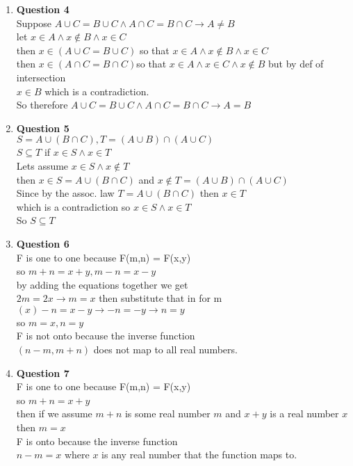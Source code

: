 \documentclass[12pt]{article}
\begin{document}
\begin{enumerate}
\item {\bf Question 4} \\
Suppose $ A \cup C = B \cup C \land A \cap C = B \cap C \rightarrow A \ne B$ \\
let $ x \in A \land x \notin B \land x \in C$ \\
then $ x \in (A \cup C = B \cup C) $ so that $ x \in A \land x \notin B \land x \in C$ \\
then $ x \in (A \cap C = B \cap C) $so that $ x \in A \land x \in C \land x \notin B$ but by def of intersection \\
$ x \in B $ which is a contradiction. \\
So therefore  $ A \cup C = B \cup C \land A \cap C = B \cap C \rightarrow A = B$ \\
\item {\bf{Question 5}} \\
$ S = A \cup (B \cap C), T = (A \cup B) \cap (A \cup C)$\\
$ S \subseteq T$ if $ x \in S \land x \in T$ \\
Lets assume $ x \in S \land x \notin T$ \\
then $ x \in S = A \cup (B \cap C)$ and $ x \notin T = (A \cup B) \cap (A \cup C)$ \\
Since by the assoc. law $ T = A \cup (B \cap C)$ then $x \in T$\\
which is a contradiction so $x \in S \land x \in T$ \\
So $ S \subseteq T$ \\

\item {\bf{Question 6}} \\
F is one to one because F(m,n) = F(x,y) \\
so $m+n = x+y , m-n = x-y$ \\
by adding the equations together we get \\
$ 2m = 2x \rightarrow m = x$ then substitute that in for m \\
$ (x)-n = x-y \rightarrow -n = -y \rightarrow n = y$ \\
so $ m = x, n = y$ \\
F is not onto because the inverse function \\
$(n-m, m+n)$ does not map to all real numbers. \\
  
\item {\bf{Question 7}} \\
F is one to one because F(m,n) = F(x,y) \\
so $m+n = x+y$ \\
then if we assume $m+n$ is some real number $m$ and $x+y$ is a real number $x$ then $m = x$ \\

F is onto because the inverse function \\
$n-m = x$ where $x$ is any real number that the function maps to. \\
  

\end{enumerate}
\end{document}
